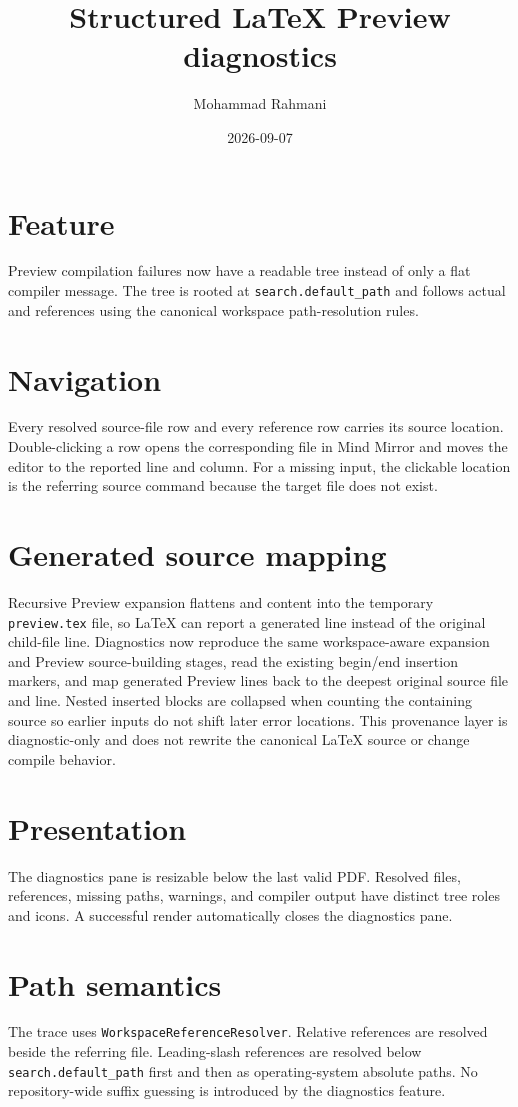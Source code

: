 \documentclass[a4paper]{article}
\title{Structured LaTeX Preview diagnostics}
\date{2026-09-07}
\author{Mohammad Rahmani}
\begin{document}
\maketitle

\section{Feature}
Preview compilation failures now have a readable tree instead of only a flat
compiler message. The tree is rooted at \verb|search.default_path| and follows
actual \verb|| and \verb|| references using the canonical
workspace path-resolution rules.

\section{Navigation}
Every resolved source-file row and every reference row carries its source
location. Double-clicking a row opens the corresponding file in Mind Mirror and
moves the editor to the reported line and column. For a missing input, the
clickable location is the referring source command because the target file does
not exist.

\section{Generated source mapping}
Recursive Preview expansion flattens \verb|| and \verb|| content
into the temporary \verb|preview.tex| file, so LaTeX can report a generated
line instead of the original child-file line. Diagnostics now reproduce the
same workspace-aware expansion and Preview source-building stages, read the
existing begin/end insertion markers, and map generated Preview lines back to
the deepest original source file and line. Nested inserted blocks are collapsed
when counting the containing source so earlier inputs do not shift later error
locations. This provenance layer is diagnostic-only and does not rewrite the
canonical LaTeX source or change compile behavior.

\section{Presentation}
The diagnostics pane is resizable below the last valid PDF. Resolved files,
references, missing paths, warnings, and compiler output have distinct tree
roles and icons. A successful render automatically closes the diagnostics pane.

\section{Path semantics}
The trace uses \verb|WorkspaceReferenceResolver|. Relative references are
resolved beside the referring file. Leading-slash references are resolved below
\verb|search.default_path| first and then as operating-system absolute paths.
No repository-wide suffix guessing is introduced by the diagnostics feature.
\end{document}
